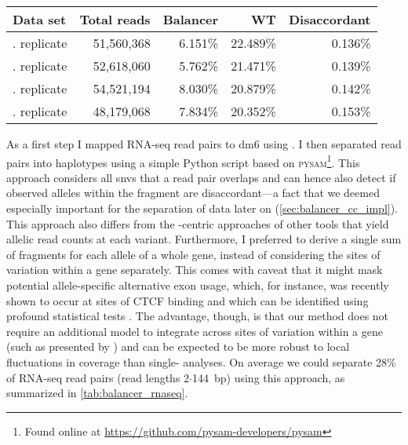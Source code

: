 \begin{table}[t]
    \centering
    \begin{tabu}{lrrrr}
        \toprule
        Data set   & Total reads   & Balancer   & WT   & Disaccordant \\
        \midrule
        . replicate & 51,560,368  & 6.151\% & 22.489\%  & 0.136\% \\
        . replicate & 52,618,060  & 5.762\% & 21.471\%  & 0.139\% \\
        . replicate & 54,521,194  & 8.030\% & 20.879\%  & 0.142\% \\
        . replicate & 48,179,068  & 7.834\% & 20.352\%  & 0.153\% \\
        \bottomrule
    \end{tabu}
\end{table}

As a first step I mapped RNA-seq read pairs to \acs{dm6} using \STAR. I then
separated read pairs into haplotypes using a simple Python script based on
\textsc{pysam}\footnote{Found online at \url{https://github.com/pysam-developers/pysam}}.
This approach considers all \acp{snv} that a read pair overlaps and can hence
also detect if observed alleles within the fragment are disaccordant---a fact
that we deemed especially important for the separation of \hic
data later on (\cref{sec:balancer_cc_impl}). This approach also differs
from the \snv-centric approaches of other tools \citep[for example]{Castel2015} that
yield allelic read counts at each variant. Furthermore, I preferred to derive a
single sum of fragments for each allele of a whole gene, instead of considering
the sites of variation within a gene separately. This comes with caveat that
it might mask potential allele-specific alternative exon usage, which, for instance, was
recently shown to occur at sites of CTCF binding
\citep{Ruiz-Velasco2017} and which can be identified using profound
statistical tests \citep[for instance]{Skelly2011}. The advantage, though, is
that our method does not require an additional model to integrate across sites of
variation within a gene (such as presented by \citet{Mayba2014}) and can be
expected to be more robust to local fluctuations in coverage than single-\snv
analyses. On average we could separate 28\% of RNA-seq read pairs (read lengths
2$\cdot$144~bp) using this approach, as summarized in \cref{tab:balancer_rnaseq}.

